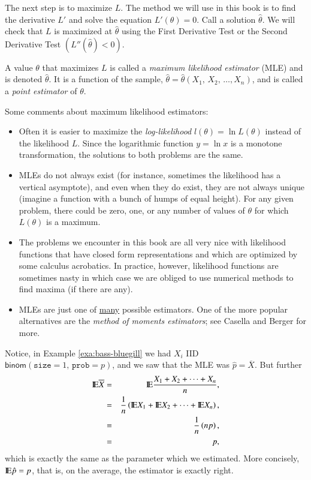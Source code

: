 \documentclass[captions=tableheading]{scrbook}
\begin{document}
The next step is to maximize \(L\). The method we will use in this book is to find the derivative \(L'\) and solve the equation \(L'(\theta)=0\). Call a solution \(\hat{\theta}\). We will check that \(L\) is maximized at \(\hat{\theta}\) using the First Derivative Test or the Second Derivative Test \(\left(L''(\hat{\theta})<0\right)\).

\begin{defn}
A value \(\theta\) that maximizes \(L\) is called a \emph{maximum likelihood estimator} (MLE) and is denoted \(\hat{\theta}\). It is a function of the sample, \(\hat{\theta}=\hat{\theta}\left(X_{1},\, X_{2},\,\ldots,X_{n}\right)\), and is called a \emph{point estimator} of \(\theta\).
\end{defn}

\begin{rem}
Some comments about maximum likelihood estimators:
\begin{itemize}
\item Often it is easier to maximize the \emph{log-likelihood} \(l(\theta)=\ln L(\theta)\) instead of the likelihood \(L\). Since the logarithmic function \(y=\ln x\) is a monotone transformation, the solutions to both problems are the same.
\item MLEs do not always exist (for instance, sometimes the likelihood has a vertical asymptote), and even when they do exist, they are not always unique (imagine a function with a bunch of humps of equal height). For any given problem, there could be zero, one, or any number of values of \(\theta\) for which \(L(\theta)\) is a maximum.
\item The problems we encounter in this book are all very nice with likelihood functions that have closed form representations and which are optimized by some calculus acrobatics. In practice, however, likelihood functions are sometimes nasty in which case we are obliged to use numerical methods to find maxima (if there are any).
\item MLEs are just one of \underline{many} possible estimators. One of the more popular alternatives are the \emph{method of moments estimators}; see Casella and Berger \cite{Casella2002} for more.
\end{itemize}
\end{rem}

Notice, in Example \ref{exa:bass-bluegill} we had \(X_{i}\) IID \(\mathsf{binom}(\mathtt{size}=1,\,\mathtt{prob}=p)\), and we saw that the MLE was \(\hat{p}=\overline{X}\). But further
\begin{eqnarray*}
\mathrm{I\hspace{-1.5pt}E}\overline{X} & = & \mathrm{I\hspace{-1.5pt}E}\frac{X_{1}+X_{2}+\cdots+X_{n}}{n},\\
 & = & \frac{1}{n}\left(\mathrm{I\hspace{-1.5pt}E} X_{1}+\mathrm{I\hspace{-1.5pt}E} X_{2}+\cdots+\mathrm{I\hspace{-1.5pt}E} X_{n}\right),\\
 & = & \frac{1}{n}\left(np\right),\\
 & = & p,
\end{eqnarray*}
which is exactly the same as the parameter which we estimated. More concisely, \(\mathrm{I\hspace{-1.5pt}E}\hat{p}=p\), that is, on the average, the estimator is exactly right.
\end{document}
